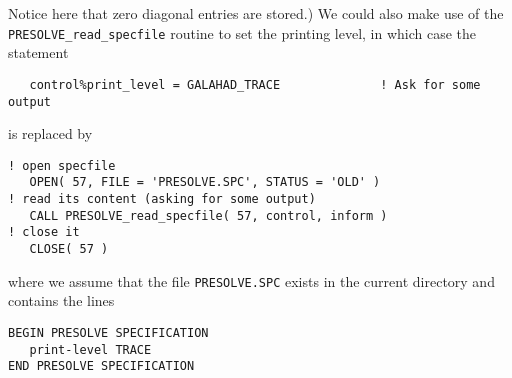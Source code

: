 \documentclass{galahad}
\newcommand{\packagename}{PRESOLVE}
\begin{document}
\noindent
Notice here that zero diagonal entries are stored.)
We could also make use of the {\tt \packagename\_read\_specfile} routine to
set the printing level, in which case the statement
{\small
\begin{verbatim}
   control%print_level = GALAHAD_TRACE              ! Ask for some output
\end{verbatim}
}
\noindent
is replaced by
{\small
\begin{verbatim}
! open specfile
   OPEN( 57, FILE = 'PRESOLVE.SPC', STATUS = 'OLD' )
! read its content (asking for some output)
   CALL PRESOLVE_read_specfile( 57, control, inform )
! close it
   CLOSE( 57 )
\end{verbatim}
}
\noindent
where we assume that the file {\tt PRESOLVE.SPC} exists in the current
directory and contains the lines
{\small
\begin{verbatim}
BEGIN PRESOLVE SPECIFICATION
   print-level TRACE
END PRESOLVE SPECIFICATION
\end{verbatim}
}
\end{document}
